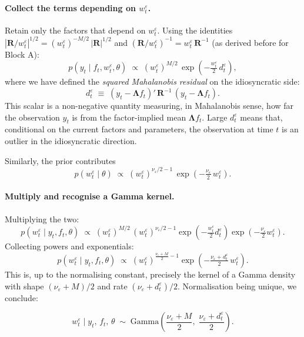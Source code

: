 \documentclass[11pt, a4paper, oneside]{article}
\newcommand{\mL}{\boldsymbol{\Lambda}}
\newcommand{\mR}{\mathbf{R}}
\begin{document}
\paragraph{Collect the terms depending on $w^\varepsilon_t$.}
Retain only the factors that depend on $w^\varepsilon_t$. Using the
identities $|\mR/w^\varepsilon_t|^{1/2} = (w^\varepsilon_t)^{-M/2}\,|\mR|^{1/2}$
and $(\mR/w^\varepsilon_t)^{-1} = w^\varepsilon_t\, \mR^{-1}$
(as derived before for Block A):
\[
p(y_t \mid f_t, w^\varepsilon_t, \theta) \;\propto\;
(w^\varepsilon_t)^{M/2}\, \exp\!\left(-\tfrac{w^\varepsilon_t}{2}\, d^\varepsilon_t\right),
\]
where we have defined the \emph{squared Mahalanobis residual} on the
idiosyncratic side:
\begin{equation}
d^\varepsilon_t \;\equiv\; (y_t - \mL f_t)'\, \mR^{-1}\, (y_t - \mL f_t).
\label{eq:d-eps}
\end{equation}
This scalar is a non-negative quantity measuring, in Mahalanobis sense,
how far the observation $y_t$ is from the factor-implied mean
$\mL f_t$. Large $d^\varepsilon_t$ means that, conditional on the
current factors and parameters, the observation at time $t$ is an
outlier in the idiosyncratic direction.

Similarly, the prior contributes
\[
p(w^\varepsilon_t \mid \theta) \;\propto\;
(w^\varepsilon_t)^{\nu_\varepsilon/2 - 1}\,
\exp\!\left(-\tfrac{\nu_\varepsilon}{2}\, w^\varepsilon_t\right).
\]

\paragraph{Multiply and recognise a Gamma kernel.}
Multiplying the two:
\[
p(w^\varepsilon_t \mid y_t, f_t, \theta) \;\propto\;
(w^\varepsilon_t)^{M/2}\, (w^\varepsilon_t)^{\nu_\varepsilon/2 - 1}
\exp\!\left(-\tfrac{w^\varepsilon_t}{2} d^\varepsilon_t\right)
\exp\!\left(-\tfrac{\nu_\varepsilon}{2} w^\varepsilon_t\right).
\]
Collecting powers and exponentials:
\[
p(w^\varepsilon_t \mid y_t, f_t, \theta) \;\propto\;
(w^\varepsilon_t)^{\tfrac{\nu_\varepsilon + M}{2} - 1}
\exp\!\left(-\tfrac{\nu_\varepsilon + d^\varepsilon_t}{2}\, w^\varepsilon_t\right).
\]
This is, up to the normalising constant, precisely the kernel of a
Gamma density with shape $(\nu_\varepsilon + M)/2$ and rate
$(\nu_\varepsilon + d^\varepsilon_t)/2$. Normalisation being unique,
we conclude:

\begin{equation}
\boxed{\;\;
w^\varepsilon_t \;\big|\; y_t,\, f_t,\, \theta \;\sim\;
\mathrm{Gamma}\!\left(\frac{\nu_\varepsilon + M}{2},\;
                       \frac{\nu_\varepsilon + d^\varepsilon_t}{2}\right).
\;\;}
\label{eq:post-w-eps}
\end{equation}
\end{document}
